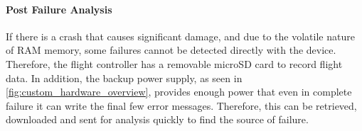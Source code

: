 \paragraph{Post Failure Analysis}
If there is a crash that causes significant damage, and due to the volatile nature of \gls{RAM} memory, some failures cannot be detected directly with the device. Therefore, the flight controller has a removable microSD card to record flight data. In addition, the backup power supply, as seen in \ref{fig:custom_hardware_overview}, provides enough power that even in complete failure it can write the final few error messages. Therefore, this can be retrieved, downloaded and sent for analysis quickly to find the source of failure.